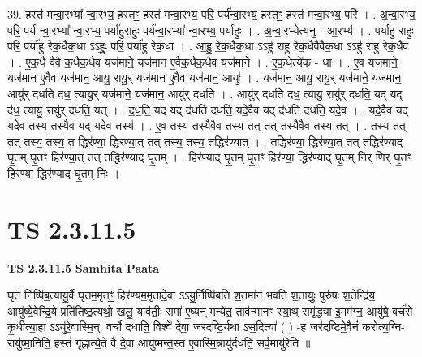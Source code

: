 \documentclass[17pt]{extarticle}
\begin{document}
39. हस्त॑ मन्वा॒रभ्या᳚ न्वा॒रभ्य॒ हस्तꣳ॒॒ हस्त॑ मन्वा॒रभ्य॒ परि॒ पर्य॑न्वा॒रभ्य॒ हस्तꣳ॒॒ हस्त॑ मन्वा॒रभ्य॒ परि॑ । . अ॒न्वा॒रभ्य॒ परि॒ पर्य॑ न्वा॒रभ्या᳚ न्वा॒रभ्य॒ पर्या॑हुराहुः॒ पर्य॑न्वा॒रभ्या᳚ न्वा॒रभ्य॒ पर्या॑हुः । . अ॒न्वा॒रभ्येत्य॑नु - आ॒रभ्य॑ । . पर्या॑हु राहुः॒ परि॒ पर्या॑हु रेक॒धैक॒धा ऽऽहुः॒ परि॒ पर्या॑हु रेक॒धा । . आ॒हु॒ रे॒क॒धैक॒धा ऽऽहु॑ राहु रेक॒धैवैवैक॒धा ऽऽहु॑ राहु रेक॒धैव । . ए॒क॒धै वैवै क॒धैक॒धैव यज॑माने॒ यज॑मान ए॒वैक॒धैक॒धैव यज॑माने । . ए॒क॒धेत्ये॑क - धा । . ए॒व यज॑माने॒ यज॑मान ए॒वैव यज॑मान॒ आयु॒ रायु॒र् यज॑मान ए॒वैव यज॑मान॒ आयुः॑ । . यज॑मान॒ आयु॒ रायु॒र् यज॑माने॒ यज॑मान॒ आयु॑र् दधति दध॒ त्यायु॒र् यज॑माने॒ यज॑मान॒ आयु॑र् दधति । . आयु॑र् दधति दध॒ त्यायु॒ रायु॑र् दधति॒ यद् यद् द॑ध॒ त्यायु॒ रायु॑र् दधति॒ यत् । . द॒ध॒ति॒ यद् यद् द॑धति दधति॒ यदे॒वैव यद् द॑धति दधति॒ यदे॒व । . यदे॒वैव यद् यदे॒व तस्य॒ तस्यै॒व यद् यदे॒व तस्य॑ । . ए॒व तस्य॒ तस्यै॒वैव तस्य॒ तत् तत् तस्यै॒वैव तस्य॒ तत् । . तस्य॒ तत् तत् तस्य॒ तस्य॒ त द्धिर॑ण्या॒ द्धिर॑ण्या॒त् तत् तस्य॒ तस्य॒ तद्धिर॑ण्यात् । . तद्धिर॑ण्या॒ द्धिर॑ण्या॒त् तत् तद्धिर॑ण्याद् घृ॒तम् घृ॒तꣳ हिर॑ण्या॒त् तत् तद्धिर॑ण्याद् घृ॒तम् । . हिर॑ण्याद् घृ॒तम् घृ॒तꣳ हिर॑ण्या॒ द्धिर॑ण्याद् घृ॒तम् निर् णिर् घृ॒तꣳ हिर॑ण्या॒ द्धिर॑ण्याद् घृ॒तम् निः । \newline
\pagebreak
{}

\section{ TS 2.3.11.5 }

\textbf{TS 2.3.11.5 } \newline
\textbf{Samhita Paata} \newline

घृ॒तं निष्पि॑ब॒त्यायु॒र्वै घृ॒तम॒मृतꣳ॒॒ हिर॑ण्यम॒मृता॑दे॒वा ऽऽयु॒र्निष्पि॑बति श॒तमा॑नं भवति श॒तायुः॒ पुरु॑षः श॒तेन्द्रि॑य॒ आयु॑ष्ये॒वेन्द्रि॒ये प्रति॑तिष्ठ॒त्यथो॒ खलु॒ याव॑तीः॒ समा॑ ए॒ष्यन् मन्ये॑त॒ ताव॑न्मानꣳ स्या॒थ् समृ॑द्ध्या इ॒मम॑ग्न॒ आयु॑षे॒ वर्च॑से कृ॒धीत्या॒हा ऽऽयु॑रे॒वास्मि॒न्. वर्चो॑ दधाति॒ विश्वे॑ देवा॒ जर॑दष्टि॒र्यथा ऽस॒दित्या॑ ( ) -ह॒ जर॑दष्टिमे॒वैनं॑ करोत्य॒ग्नि-रायु॑ष्मा॒निति॒ हस्तं॑ गृह्णात्ये॒ते वै दे॒वा आयु॑ष्मन्त॒स्त ए॒वास्मि॒न्नायु॑र्दधति॒ सर्व॒मायु॑रेति ॥ \newline
\end{document}
